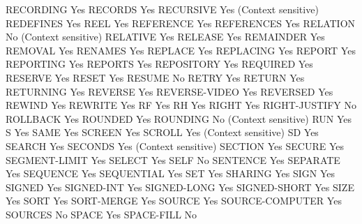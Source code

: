 RECORDING                       Yes
RECORDS                         Yes
RECURSIVE                       Yes (Context sensitive)
REDEFINES                       Yes
REEL                            Yes
REFERENCE                       Yes
REFERENCES                      Yes
RELATION                        No (Context sensitive)
RELATIVE                        Yes
RELEASE                         Yes
REMAINDER                       Yes
REMOVAL                         Yes
RENAMES                         Yes
REPLACE                         Yes
REPLACING                       Yes
REPORT                          Yes
REPORTING                       Yes
REPORTS                         Yes
REPOSITORY                      Yes
REQUIRED                        Yes
RESERVE                         Yes
RESET                           Yes
RESUME                          No
RETRY                           Yes
RETURN                          Yes
RETURNING                       Yes
REVERSE                         Yes
REVERSE-VIDEO                   Yes
REVERSED                        Yes
REWIND                          Yes
REWRITE                         Yes
RF                              Yes
RH                              Yes
RIGHT                           Yes
RIGHT-JUSTIFY                   No
ROLLBACK                        Yes
ROUNDED                         Yes
ROUNDING                        No (Context sensitive)
RUN                             Yes
S                               Yes
SAME                            Yes
SCREEN                          Yes
SCROLL                          Yes (Context sensitive)
SD                              Yes
SEARCH                          Yes
SECONDS                         Yes (Context sensitive)
SECTION                         Yes
SECURE                          Yes
SEGMENT-LIMIT                   Yes
SELECT                          Yes
SELF                            No
SENTENCE                        Yes
SEPARATE                        Yes
SEQUENCE                        Yes
SEQUENTIAL                      Yes
SET                             Yes
SHARING                         Yes
SIGN                            Yes
SIGNED                          Yes
SIGNED-INT                      Yes
SIGNED-LONG                     Yes
SIGNED-SHORT                    Yes
SIZE                            Yes
SORT                            Yes
SORT-MERGE                      Yes
SOURCE                          Yes
SOURCE-COMPUTER                 Yes
SOURCES                         No
SPACE                           Yes
SPACE-FILL                      No
